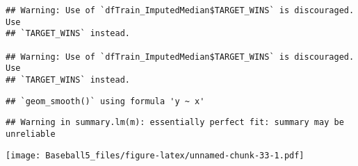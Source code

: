 \documentclass[
]{article}
\newenvironment{Shaded}{\begin{snugshade}}{\end{snugshade}}
\newcommand{\AttributeTok}[1]{\textcolor[rgb]{0.77,0.63,0.00}{#1}}
\newcommand{\ControlFlowTok}[1]{\textcolor[rgb]{0.13,0.29,0.53}{\textbf{#1}}}
\newcommand{\DecValTok}[1]{\textcolor[rgb]{0.00,0.00,0.81}{#1}}
\newcommand{\FunctionTok}[1]{\textcolor[rgb]{0.00,0.00,0.00}{#1}}
\newcommand{\NormalTok}[1]{#1}
\newcommand{\OtherTok}[1]{\textcolor[rgb]{0.56,0.35,0.01}{#1}}
\newcommand{\SpecialCharTok}[1]{\textcolor[rgb]{0.00,0.00,0.00}{#1}}
\begin{document}
\begin{Shaded}
\end{Shaded}

\begin{verbatim}
## Warning: Use of `dfTrain_ImputedMedian$TARGET_WINS` is discouraged. Use
## `TARGET_WINS` instead.

## Warning: Use of `dfTrain_ImputedMedian$TARGET_WINS` is discouraged. Use
## `TARGET_WINS` instead.
\end{verbatim}

\begin{verbatim}
## `geom_smooth()` using formula 'y ~ x'
\end{verbatim}

\begin{verbatim}
## Warning in summary.lm(m): essentially perfect fit: summary may be unreliable
\end{verbatim}

\texttt{[image: Baseball5\_files/figure-latex/unnamed-chunk-33-1.pdf]}
\end{document}
